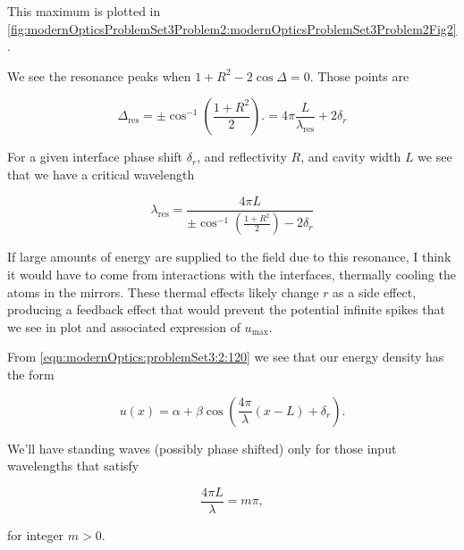 {This maximum is plotted in \cref{fig:modernOpticsProblemSet3Problem2:modernOpticsProblemSet3Problem2Fig2}.


We see the resonance peaks when $1 + R^2 - 2 \cos\Delta = 0$.  Those points are 

\begin{dmath}\label{eqn:modernOptics:problemSet3:2:320}
\Delta_{\mathrm{res}} = \pm \cos^{-1} \left( \frac{1 + R^2}{2} \right).
= 4 \pi \frac{L}{\lambda_{\mathrm{res}}} + 2 \delta_r
\end{dmath}

For a given interface phase shift $\delta_r$, and reflectivity $R$, and cavity width $L$ we see that we have a critical wavelength

\begin{dmath}\label{eqn:modernOptics:problemSet3:2:340}
\lambda_{\mathrm{res}}
=\frac{4 \pi L}{
\pm \cos^{-1} \left( \frac{1 + R^2}{2} \right) - 2 \delta_r
}
\end{dmath}

If large amounts of energy are supplied to the field due to this resonance, I think it would have to come from interactions with the interfaces, thermally cooling the atoms in the mirrors.  These thermal effects likely change $r$ as a side effect, producing a feedback effect that would prevent the potential infinite spikes that we see in plot and associated expression of $u_{\mathrm{max}}$.


From \ref{eqn:modernOptics:problemSet3:2:120} we see that our energy density has the form

\begin{dmath}\label{eqn:modernOptics:problemSet3:2:440}
u(x) 
= \alpha + \beta \cos\left( \frac{4 \pi}{\lambda} (x - L) + \delta_r \right).
\end{dmath}

We'll have standing waves (possibly phase shifted) only for those input wavelengths that satisfy

\begin{dmath}\label{eqn:modernOptics:problemSet3:2:460}
\frac{4 \pi L}{\lambda} = m \pi,
\end{dmath}

for integer $m > 0$.

}
